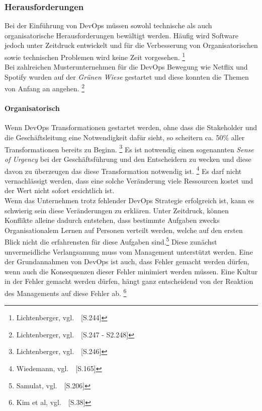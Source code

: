 \subsubsection{Herausforderungen}\label{devops_herausforderungen}

Bei der Einführung von DevOps müssen sowohl technische als auch organisatorische Herausforderungen bewältigt werden.
Häufig wird Software jedoch unter Zeitdruck entwickelt und für die Verbesserung von Organisatorischen sowie technischen Problemen wird keine Zeit vorgesehen.
\footnote{Lichtenberger, vgl.~\cite{Lichtenberger2017}~[S.244]} \\

Bei zahlreichen Musterunternehmen für die DevOps Bewegung wie Netflix und Spotify wurden auf der \textsl{Grünen Wiese} gestartet und diese konnten die Themen von Anfang an angehen.
\footnote{Lichtenberger, vgl.~\cite{Lichtenberger2017}~[S.247 - S2.248]}

\paragraph{Organisatorisch}

Wenn DevOps Transformationen gestartet werden, ohne dass die Stakeholder und die Geschäftsleitung eine Notwendigkeit dafür sieht,
so scheitern ca. 50\% aller Transformationen bereits zu Beginn. \footnote{Lichtenberger, vgl.~\cite{Lichtenberger2017}~[S.246]} %
Es ist notwendig einen sogenannten \textsl{Sense of Urgency} bei der Geschäftsführung und den Entscheidern zu wecken und diese
davon zu überzeugen das diese Transformation notwendig ist. \footnote{Wiedemann, vgl.~\cite{Wiedemann2019}~[S.165]}
Es darf nicht vernachlässigt werden, dass eine solche Veränderung viele Ressourcen kostet und der Wert nicht sofort ersichtlich ist. \\

Wenn das Unternehmen trotz fehlender DevOps Strategie erfolgreich ist, kann es schwierig sein diese Veränderungen zu erklären.
Unter Zeitdruck, können Konflikte alleine dadurch entstehen, dass bestimmte Aufgaben zwecks
Organisationalem Lernen auf Personen verteilt werden, welche auf den ersten Blick nicht die erfahrensten für diese Aufgaben sind.\footnote{Samulat, vgl.~\cite{Samulat2017}~[S.206]}
Diese zunächst unvermeidliche Verlangsamung muss vom Management unterstützt werden.
Eine der Grundannahmen von DevOps ist auch, dass Fehler gemacht werden dürfen, wenn auch die Konsequenzen dieser Fehler minimiert werden müssen.
Eine Kultur in der Fehler gemacht werden dürfen, hängt ganz entscheidend von der Reaktion des Managements auf diese Fehler ab. \footnote{Kim et al, vgl.~\cite{Kim2018}~[S.38]} \\

